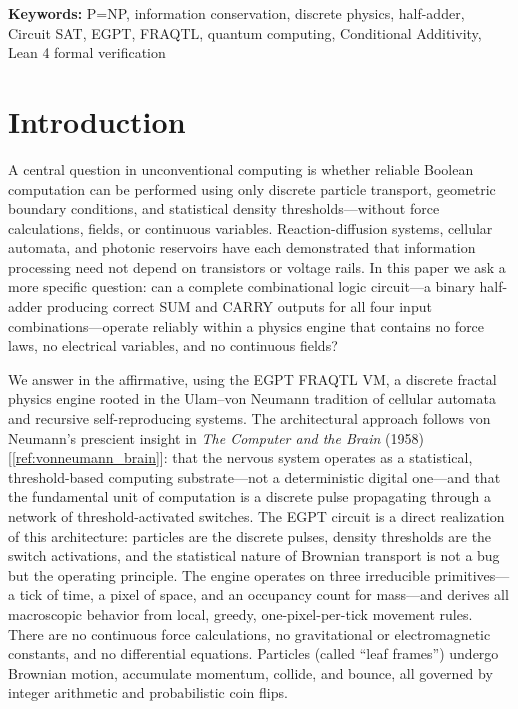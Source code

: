 \documentclass[11pt,a4paper]{article}
\begin{document}
\vspace{1em}
\noindent\textbf{Keywords:} P=NP, information conservation, discrete physics, half-adder, Circuit SAT, EGPT, FRAQTL, quantum computing, Conditional Additivity, Lean 4 formal verification

\newpage
\tableofcontents
\newpage

\section{Introduction}

A central question in unconventional computing is whether reliable Boolean computation can be performed using only discrete particle transport, geometric boundary conditions, and statistical density thresholds---without force calculations, fields, or continuous variables. Reaction-diffusion systems, cellular automata, and photonic reservoirs have each demonstrated that information processing need not depend on transistors or voltage rails. In this paper we ask a more specific question: can a complete combinational logic circuit---a binary half-adder producing correct SUM and CARRY outputs for all four input combinations---operate reliably within a physics engine that contains no force laws, no electrical variables, and no continuous fields?

We answer in the affirmative, using the EGPT FRAQTL VM, a discrete fractal physics engine rooted in the Ulam--von Neumann tradition of cellular automata and recursive self-reproducing systems. The architectural approach follows von Neumann's prescient insight in \emph{The Computer and the Brain} (1958) [\ref{ref:vonneumann_brain}]: that the nervous system operates as a statistical, threshold-based computing substrate---not a deterministic digital one---and that the fundamental unit of computation is a discrete pulse propagating through a network of threshold-activated switches. The EGPT circuit is a direct realization of this architecture: particles are the discrete pulses, density thresholds are the switch activations, and the statistical nature of Brownian transport is not a bug but the operating principle. The engine operates on three irreducible primitives---a tick of time, a pixel of space, and an occupancy count for mass---and derives all macroscopic behavior from local, greedy, one-pixel-per-tick movement rules. There are no continuous force calculations, no gravitational or electromagnetic constants, and no differential equations. Particles (called ``leaf frames'') undergo Brownian motion, accumulate momentum, collide, and bounce, all governed by integer arithmetic and probabilistic coin flips.
\end{document}
